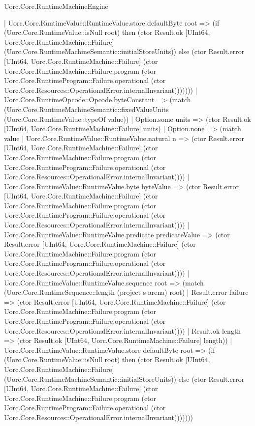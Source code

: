 \begin{lexlean}{Uorc.Core.RuntimeMachineEngine}
\begin{semanticmodule}
{              | Uorc.Core.RuntimeValue::RuntimeValue.store defaultByte root => (if (Uorc.Core.RuntimeValue::isNull root) then (ctor Result.ok [UInt64, Uorc.Core.RuntimeMachine::Failure] (Uorc.Core.RuntimeMachineSemantic::initialStoreUnits)) else (ctor Result.error [UInt64, Uorc.Core.RuntimeMachine::Failure] (ctor Uorc.Core.RuntimeMachine::Failure.program (ctor Uorc.Core.RuntimeProgram::Failure.operational (ctor Uorc.Core.Resources::OperationalError.internalInvariant)))))))
          | Uorc.Core.RuntimeOpcode::Opcode.byteConstant => (match (Uorc.Core.RuntimeMachineSemantic::fixedValueUnits (Uorc.Core.RuntimeValue::typeOf value))
            | Option.some units => (ctor Result.ok [UInt64, Uorc.Core.RuntimeMachine::Failure] units)
            | Option.none => (match value
              | Uorc.Core.RuntimeValue::RuntimeValue.natural n => (ctor Result.error [UInt64, Uorc.Core.RuntimeMachine::Failure] (ctor Uorc.Core.RuntimeMachine::Failure.program (ctor Uorc.Core.RuntimeProgram::Failure.operational (ctor Uorc.Core.Resources::OperationalError.internalInvariant))))
              | Uorc.Core.RuntimeValue::RuntimeValue.byte byteValue => (ctor Result.error [UInt64, Uorc.Core.RuntimeMachine::Failure] (ctor Uorc.Core.RuntimeMachine::Failure.program (ctor Uorc.Core.RuntimeProgram::Failure.operational (ctor Uorc.Core.Resources::OperationalError.internalInvariant))))
              | Uorc.Core.RuntimeValue::RuntimeValue.predicate predicateValue => (ctor Result.error [UInt64, Uorc.Core.RuntimeMachine::Failure] (ctor Uorc.Core.RuntimeMachine::Failure.program (ctor Uorc.Core.RuntimeProgram::Failure.operational (ctor Uorc.Core.Resources::OperationalError.internalInvariant))))
              | Uorc.Core.RuntimeValue::RuntimeValue.sequence root => (match (Uorc.Core.RuntimeSequence::length (project s arena) root)
                | Result.error failure => (ctor Result.error [UInt64, Uorc.Core.RuntimeMachine::Failure] (ctor Uorc.Core.RuntimeMachine::Failure.program (ctor Uorc.Core.RuntimeProgram::Failure.operational (ctor Uorc.Core.Resources::OperationalError.internalInvariant))))
                | Result.ok length => (ctor Result.ok [UInt64, Uorc.Core.RuntimeMachine::Failure] length))
              | Uorc.Core.RuntimeValue::RuntimeValue.store defaultByte root => (if (Uorc.Core.RuntimeValue::isNull root) then (ctor Result.ok [UInt64, Uorc.Core.RuntimeMachine::Failure] (Uorc.Core.RuntimeMachineSemantic::initialStoreUnits)) else (ctor Result.error [UInt64, Uorc.Core.RuntimeMachine::Failure] (ctor Uorc.Core.RuntimeMachine::Failure.program (ctor Uorc.Core.RuntimeProgram::Failure.operational (ctor Uorc.Core.Resources::OperationalError.internalInvariant)))))))
}
\end{semanticmodule}
\end{lexlean}
